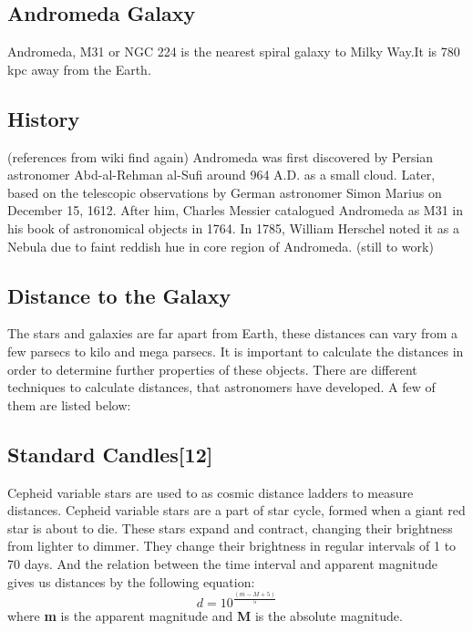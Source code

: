 \documentclass{article}
\begin{document}
  \subsection*{Andromeda Galaxy} 
  Andromeda, M31 or NGC 224 is the nearest spiral galaxy to Milky Way.It is 780 kpc away from the Earth.
  \subsection*{History}(references from wiki find again)
  Andromeda was first discovered by Persian astronomer Abd-al-Rehman al-Sufi around 964 A.D. as a small cloud. Later, based on the telescopic observations by German astronomer Simon Marius on December 15, 1612. After him, Charles Messier catalogued Andromeda as M31 in his book of astronomical objects in 1764. In 1785, William Herschel noted it as a Nebula due to faint reddish hue in core region of Andromeda.     (still to work)
\subsection{Distance to the Galaxy}
The stars and galaxies are far apart from Earth, these distances can vary from a few parsecs to kilo and mega parsecs. It is important to calculate the distances in order to determine further properties of these objects. There are different techniques to calculate distances, that astronomers have developed. 
A few of them are listed below:
\subsection*{Standard Candles[12]}
 Cepheid variable stars are used to as cosmic distance ladders to measure distances. Cepheid variable stars are a part of star cycle, formed when a giant red star is about to die. These stars expand and contract, changing their brightness from lighter to dimmer.  They change their brightness in regular intervals of 1 to 70 days. And the relation between the time interval and apparent magnitude gives us distances by the following equation:
 \begin{equation}
 d= 10^{\frac{(m-M+5)}{5}}
 \end{equation}
where \textbf{m} is the apparent magnitude and \textbf{M} is the absolute magnitude.
\end{document}
